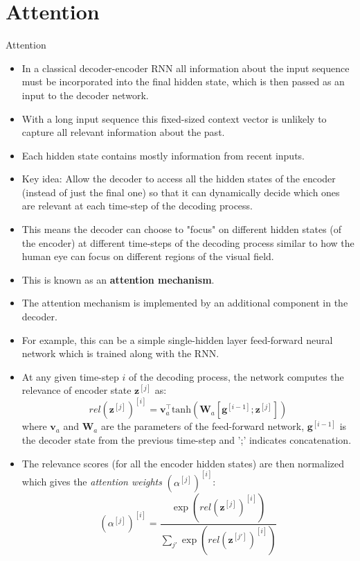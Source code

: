 \section{Attention}

\begin{vbframe}{Attention}
  \begin{itemize}
    \item In a classical decoder-encoder RNN all information about the input sequence must be incorporated into the final hidden state, which is then passed as an input to the decoder network.
    \item With a long input sequence this fixed-sized context vector is unlikely to capture all relevant information about the past.
      \item Each hidden state contains mostly information from recent inputs. 
      \item Key idea: Allow the decoder to access all the hidden states of the encoder (instead of just the final one) so that it can dynamically decide which ones are relevant at each time-step of the decoding process.
      \item This means the decoder can choose to "focus" on different hidden states (of the encoder) at different time-steps of the decoding process similar to how the human eye can focus on different regions of the visual field.
      \item This is known as an \textbf{attention mechanism}.
   \end{itemize}
   
   \framebreak
   
   \begin{itemize}
      \item The attention mechanism is implemented by an additional component in the decoder.
      \item For example, this can be a simple single-hidden layer feed-forward neural network which is trained along with the RNN.
      \item At any given time-step $i$ of the decoding process, the network computes the relevance of encoder state $\bm{z}^{[j]}$ as:
            $$ rel(\bm{z}^{[j]})^{[i]} = \bm{v}_a^\top \text{tanh} (\bm{W}_a[\bm{g}^{[i-1]};\bm{z}^{[j]}]) $$
            where $\bm{v}_a$ and $\bm{W}_a$ are the parameters of the feed-forward network, $\bm{g}^{[i-1]}$ is the decoder state from the previous time-step and ';' indicates concatenation.
      \item The relevance scores (for all the encoder hidden states) are then normalized which gives the \textit{attention weights} $(\alpha^{[j]})^{[i]}$:      
        $$ (\alpha^{[j]})^{[i]} = \frac{\exp (rel(\bm{z}^{[j]})^{[i]})}{\sum_{j'} \exp(rel(\bm{z}^{[j']})^{[i]})} $$
   \end{itemize}
   

\end{vbframe}
